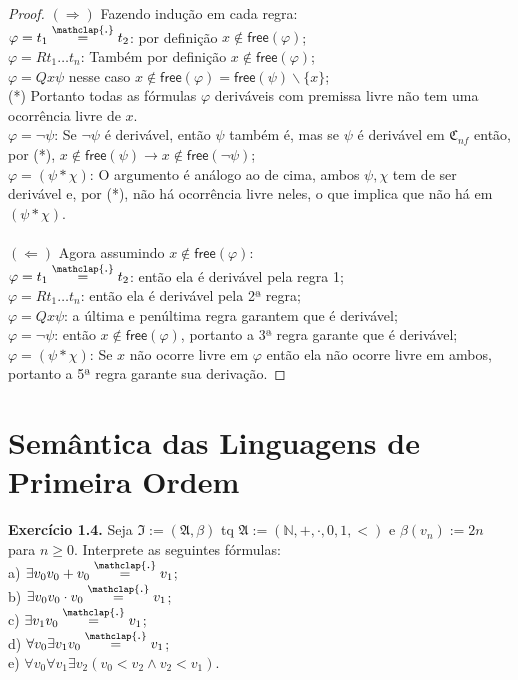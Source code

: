 \documentclass[11pt]{article}
\newcommand{\mf}[1]{\mathfrak{#1}}
\newcommand{\msf}[1]{\mathsf{#1}}
\newcommand{\mbb}[1]{\mathbb{#1}}
\newcommand\overtext[2]{\stackrel{\mathclap{\normalfont\mbox{#1}}}{#2}}
\begin{document}
\begin{proof}
    $(\Rightarrow)$ Fazendo indução em cada regra:\\
    $\varphi=t_1\overtext{.}{=} t_2$: por definição $x\notin\msf{free}(\varphi)$;\\
    $\varphi=Rt_1\dots t_n$: Também por definição $x\notin\msf{free}(\varphi)$;\\
    $\varphi=Qx\psi$ nesse caso $x\notin\msf{free}(\varphi)=\msf{free}(\psi)\backslash\{x\}$;\\
    (*) Portanto todas as fórmulas $\varphi$ deriváveis com premissa livre não tem uma ocorrência livre de $x$.\\
    $\varphi=\neg\psi$: Se $\neg\psi$ é derivável, então $\psi$ também é, mas se $\psi$ é derivável em $\mf{C}_{nf}$ então, por (*), $x\notin\msf{free}(\psi)\to x\notin\msf{free}(\neg\psi)$;\\
    $\varphi=(\psi*\chi)$: O argumento é análogo ao de cima, ambos $\psi,\chi$ tem de ser derivável e, por (*), não há ocorrência livre neles, o que implica que não há em $(\psi*\chi)$.\\\\
    $(\Leftarrow)$ Agora assumindo $x\notin\msf{free}(\varphi)$:\\
    $\varphi=t_1\overtext{.}{=} t_2$: então ela é derivável pela regra 1;\\
    $\varphi=Rt_1\dots t_n$: então ela é derivável pela 2ª regra;\\
    $\varphi=Qx\psi$: a última e penúltima regra garantem que é derivável;\\
    $\varphi=\neg\psi$: então $x\notin\msf{free}(\varphi)$, portanto a 3ª regra garante que é derivável;\\
    $\varphi=(\psi*\chi)$: Se $x$ não ocorre livre em $\varphi$ então ela não ocorre livre em ambos, portanto a 5ª regra garante sua derivação.
\end{proof}

\section{Semântica das Linguagens de Primeira Ordem}

\begin{shaded}
\textbf{Exercício 1.4.} Seja $\mf{I}:=(\mf{A},\beta)$ tq $\mf{A}:=(\mbb{N},+,\cdot,0,1,<)$ e $\beta(v_n):=2n$ para $n\ge0$. Interprete as seguintes fórmulas:\\
a) $\exists v_0v_0+v_0\overtext{.}{=} v_1$;\\
b) $\exists v_0v_0\cdot v_0\overtext{.}{=} v_1$;\\
c) $\exists v_1v_0\overtext{.}{=} v_1$;\\
d) $\forall v_0\exists v_1v_0\overtext{.}{=} v_1$;\\
e) $\forall v_0\forall v_1\exists v_2(v_0<v_2\wedge v_2<v_1)$.
\end{shaded}
\end{document}
